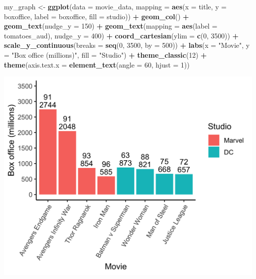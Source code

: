 \documentclass[
]{krantz}
\makeatletter
\newenvironment{Shaded}{\begin{snugshade}}{\end{snugshade}}
\newcommand{\DataTypeTok}[1]{\textcolor[rgb]{0.27,0.27,0.27}{#1}}
\newcommand{\DecValTok}[1]{\textcolor[rgb]{0.06,0.06,0.06}{#1}}
\newcommand{\KeywordTok}[1]{\textcolor[rgb]{0.27,0.27,0.27}{\textbf{#1}}}
\newcommand{\NormalTok}[1]{#1}
\newcommand{\OperatorTok}[1]{\textcolor[rgb]{0.43,0.43,0.43}{\textbf{#1}}}
\newcommand{\StringTok}[1]{\textcolor[rgb]{0.5,0.5,0.5}{#1}}
\newenvironment{kframe}{%
\medskip{}
\setlength{\fboxsep}{.8em}
 \def\at@end@of@kframe{}%
 \ifinner\ifhmode%
  \def\at@end@of@kframe{\end{minipage}}%
  \begin{minipage}{\columnwidth}%
 \fi\fi%
 \def\FrameCommand##1{\hskip\@totalleftmargin \hskip-\fboxsep
 \colorbox{shadecolor}{##1}\hskip-\fboxsep
     \hskip-\linewidth \hskip-\@totalleftmargin \hskip\columnwidth}%
 \MakeFramed {\advance\hsize-\width
   \@totalleftmargin\z@ \linewidth\hsize
   \@setminipage}}%
 {\par\unskip\endMakeFramed%
 \at@end@of@kframe}
\renewenvironment{Shaded}{\begin{kframe}}{\end{kframe}}
\makeatother
\begin{document}
\begin{Shaded}
\begin{Highlighting}[]
\NormalTok{my_graph <-}\StringTok{ }\KeywordTok{ggplot}\NormalTok{(}\DataTypeTok{data =}\NormalTok{ movie_data,}
           \DataTypeTok{mapping =} \KeywordTok{aes}\NormalTok{(}\DataTypeTok{x =}\NormalTok{ title,}
                         \DataTypeTok{y =}\NormalTok{ boxoffice,}
                         \DataTypeTok{label =}\NormalTok{ boxoffice, }
                         \DataTypeTok{fill =}\NormalTok{ studio)) }\OperatorTok{+}
\StringTok{  }\KeywordTok{geom_col}\NormalTok{() }\OperatorTok{+}
\StringTok{  }\KeywordTok{geom_text}\NormalTok{(}\DataTypeTok{nudge_y =} \DecValTok{150}\NormalTok{)  }\OperatorTok{+}
\StringTok{  }\KeywordTok{geom_text}\NormalTok{(}\DataTypeTok{mapping =} \KeywordTok{aes}\NormalTok{(}\DataTypeTok{label =}\NormalTok{ tomatoes_aud), }
            \DataTypeTok{nudge_y =} \DecValTok{400}\NormalTok{) }\OperatorTok{+}
\StringTok{  }\KeywordTok{coord_cartesian}\NormalTok{(}\DataTypeTok{ylim =} \KeywordTok{c}\NormalTok{(}\DecValTok{0}\NormalTok{, }\DecValTok{3500}\NormalTok{)) }\OperatorTok{+}
\StringTok{  }\KeywordTok{scale_y_continuous}\NormalTok{(}\DataTypeTok{breaks =} \KeywordTok{seq}\NormalTok{(}\DecValTok{0}\NormalTok{, }\DecValTok{3500}\NormalTok{, }\DataTypeTok{by =} \DecValTok{500}\NormalTok{)) }\OperatorTok{+}
\StringTok{  }\KeywordTok{labs}\NormalTok{(}\DataTypeTok{x =} \StringTok{"Movie"}\NormalTok{,}
       \DataTypeTok{y =} \StringTok{"Box office (millions)"}\NormalTok{,}
       \DataTypeTok{fill =} \StringTok{"Studio"}\NormalTok{) }\OperatorTok{+}
\StringTok{  }\KeywordTok{theme_classic}\NormalTok{(}\DecValTok{12}\NormalTok{) }\OperatorTok{+}
\StringTok{  }\KeywordTok{theme}\NormalTok{(}\DataTypeTok{axis.text.x =} \KeywordTok{element_text}\NormalTok{(}\DataTypeTok{angle =} \DecValTok{60}\NormalTok{, }
                                   \DataTypeTok{hjust =} \DecValTok{1}\NormalTok{))  }
\end{Highlighting}
\end{Shaded}

\includegraphics[width=0.85\linewidth]{ch_graphing/images/custom_order}
\end{document}
